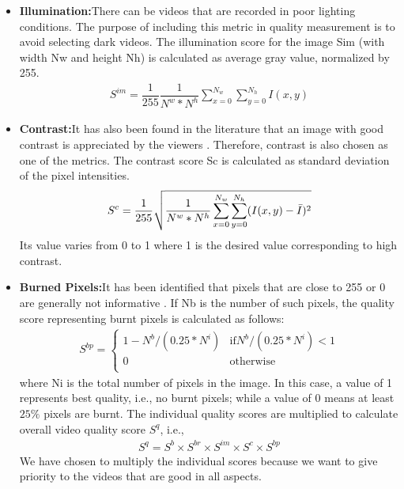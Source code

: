 \documentclass{sig-alternate}
\begin{document}
\begin{itemize}
    \item \textbf{Illumination:}There can be videos that are recorded in poor lighting conditions. The purpose of including this metric in quality measurement is to avoid selecting dark videos. The illumination score for the image Sim (with width Nw and height Nh) is calculated as average gray value, normalized by 255.
    \begin{align}
        S^{im} = \dfrac{1}{255}\dfrac{1}{N^w*N^h} \sum_{x=0}^{N_w}\sum_{y=0}^{N_h}I(x,y)
    \end{align}
    \item \textbf{Contrast:}It has also been found in the literature that an image with good contrast is appreciated by the viewers \cite{10}. Therefore, contrast is also chosen as one of the metrics. The contrast score Sc is calculated as standard deviation of the pixel intensities.
    \begin{align}
        S^{c} = \dfrac{1}{255}\sqrt{\dfrac{1}{N^w*N^h} \sum_{x=0}^{N_w}\sum_{y=0}^{N_h}(I(x,y)-\Bar{I})^2}
    \end{align}
    Its value varies from 0 to 1 where 1 is the desired value corresponding to high contrast.
    \item \textbf{Burned Pixels:}It has been identified that pixels that are close to 255 or 0 are generally not informative \cite{15}. If Nb is the number of such pixels, the quality score representing burnt pixels is calculated as follows:
    \begin{align}
    S^{bp} =
  \begin{cases}
                                   1- N^b/(0.25*N^i) & \text{if} N^b/(0.25*N^i)<1 \\
                                   0 & \text{otherwise} \\
  \end{cases}
  \end{align}
  where Ni is the total number of pixels in the image. In this case, a value of 1 represents best quality, i.e., no burnt pixels; while a value of 0 means at least $25\%$ pixels are burnt.
  The individual quality scores are multiplied to calculate overall video quality score $S^q$, i.e.,
  \begin{align}
      S^q=S^b \times S^{br} \times S^{im} \times S^c \times S^{bp}
  \end{align}
  We have chosen to multiply the individual scores because we want to give priority to the videos that are good in all aspects.
  \end{itemize}
\end{document}
